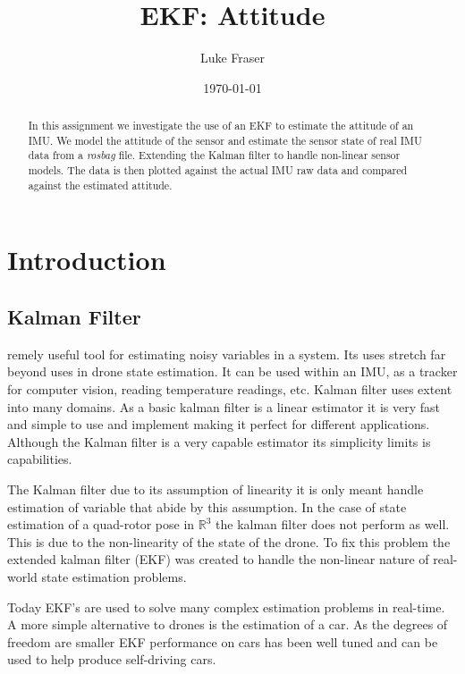 \documentclass[letter]{IEEEtran}
\title{EKF: Attitude}
\date{\today}
\begin{document}
\author{Luke Fraser}
\maketitle

\begin{abstract}
In this assignment we investigate the use of an EKF to estimate the attitude of an IMU. We model the attitude of the sensor and estimate the sensor state of real IMU data from a \emph{rosbag} file. Extending the Kalman filter to handle non-linear sensor models. The data is then plotted against the actual IMU raw data and compared against the estimated attitude.
\end{abstract}

\section{Introduction}
\subsection{Kalman Filter}
remely useful tool for estimating noisy variables in a system. Its uses stretch far beyond uses in drone state estimation. It can be used within an IMU, as a tracker for computer vision, reading temperature readings, etc. Kalman filter uses extent into many domains. As a basic kalman filter is a linear estimator it is very fast and simple to use and implement making it perfect for different applications. Although the Kalman filter is a very capable estimator its simplicity limits is capabilities.

The Kalman filter due to its assumption of linearity it is only meant handle estimation of variable that abide by this assumption. In the case of state estimation of a quad-rotor pose in $\mathbb{R}^3$ the kalman filter does not perform as well. This is due to the non-linearity of the state of the drone. To fix this problem the extended kalman filter (EKF) was created to handle the non-linear nature of real-world state estimation problems.

Today EKF's are used to solve many complex estimation problems in real-time. A more simple alternative to drones is the estimation of a car. As the degrees of freedom are smaller EKF performance on cars has been well tuned and can be used to help produce self-driving cars.
\end{document}
